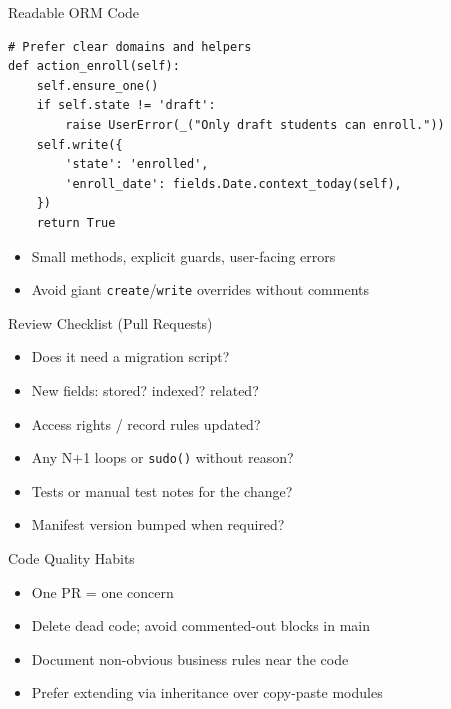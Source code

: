 \begin{frame}[fragile]{Readable ORM Code}
\begin{lstlisting}
# Prefer clear domains and helpers
def action_enroll(self):
    self.ensure_one()
    if self.state != 'draft':
        raise UserError(_("Only draft students can enroll."))
    self.write({
        'state': 'enrolled',
        'enroll_date': fields.Date.context_today(self),
    })
    return True
\end{lstlisting}

\vspace{0.3em}
\begin{itemize}
  \item Small methods, explicit guards, user-facing errors
  \item Avoid giant \texttt{create}/\texttt{write} overrides without comments
\end{itemize}
\end{frame}

\begin{frame}{Review Checklist (Pull Requests)}
\begin{itemize}
  \item Does it need a migration script?
  \item New fields: stored? indexed? related?
  \item Access rights / record rules updated?
  \item Any N+1 loops or \texttt{sudo()} without reason?
  \item Tests or manual test notes for the change?
  \item Manifest version bumped when required?
\end{itemize}
\end{frame}

\begin{frame}{Code Quality Habits}
\begin{itemize}
  \item One PR = one concern
  \item Delete dead code; avoid commented-out blocks in main
  \item Document non-obvious business rules near the code
  \item Prefer extending via inheritance over copy-paste modules
\end{itemize}
\end{frame}
